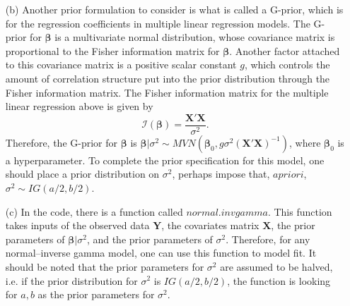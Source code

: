 \documentclass[11pt]{article}
\begin{document}
\begin{itemize}
\item[(b)]  Another prior formulation to consider is what is called a G-prior, which is for the regression coefficients in multiple linear regression models.  The G-prior for $\boldsymbol\beta$ is a multivariate normal distribution, whose covariance matrix is proportional to the Fisher information matrix for $\boldsymbol\beta$.  Another factor attached to this covariance matrix is a positive scalar constant $g$, which controls the amount of correlation structure put into the prior distribution through the Fisher information matrix.  The Fisher information matrix for the multiple linear regression above is given by
\[
\mathcal{I}(\boldsymbol\beta) = \frac{\mathbf{X}'\mathbf{X}}{\sigma^2}.
\]
Therefore, the G-prior for $\boldsymbol\beta$ is $\boldsymbol\beta|\sigma^2 \sim MVN(\boldsymbol\beta_0,g\sigma^{2}(\mathbf{X}'\mathbf{X})^{-1})$, where $\boldsymbol\beta_0$ is a hyperparameter.  To complete the prior specification for this model, one should place a prior distribution on $\sigma^2$, perhaps impose that, $apriori$, $\sigma^2\sim IG(a/2,b/2)$.
\item[(c)]  In the code, there is a function called $normal.invgamma$.  This function takes inputs of the observed data $\mathbf{Y}$, the covariates matrix $\mathbf{X}$, the prior parameters of $\boldsymbol\beta|\sigma^2$, and the prior parameters of $\sigma^2$.  Therefore, for any normal--inverse gamma model, one can use this function to model fit.  It should be noted that the prior parameters for $\sigma^2$ are assumed to be halved, i.e. if the prior distribution for $\sigma^2$ is $IG(a/2,b/2)$, the function is looking for $a,b$ as the prior parameters for $\sigma^2$.


\end{itemize}
\end{document}
